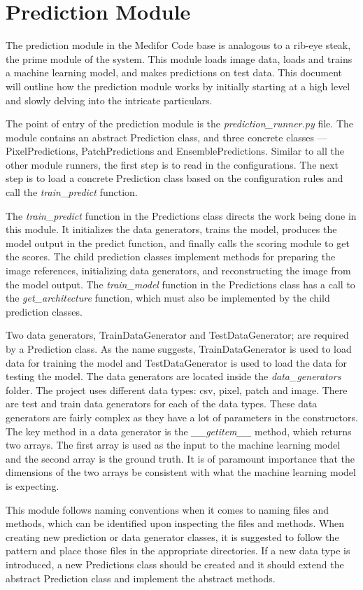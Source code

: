 \section{Prediction Module}

The prediction module in the Medifor Code base is analogous to a rib-eye steak, the prime  module of the system. This module loads image data,
 loads and trains a machine learning model, and makes predictions on test data. This document will outline how the prediction module works by
  initially starting at a high level and slowly delving into the intricate particulars.

The point of entry of the prediction module is the \emph{prediction\_runner.py} file. The module contains an abstract Prediction class, and three 
concrete classes — PixelPredictions, PatchPredictions and EnsemblePredictions. Similar to all the other module runners, the first step is
 to read in the configurations. The next step is to load a concrete Prediction class based on the configuration rules and call the 
 \emph{train\_predict} function. 

The \emph{train\_predict} function in the Predictions class directs the work being done in this module. It initializes the data generators, 
trains the model, produces the model output in the predict function, and finally calls the scoring module to get the scores. The 
child prediction classes implement methods for preparing the image references, initializing data generators, and reconstructing
 the image from the model output. The \emph{train\_model} function in the Predictions class has a call to the \emph{get\_architecture} function,
  which must also be implemented by the child prediction classes.

Two data generators, TrainDataGenerator and TestDataGenerator; are required by a Prediction class. As the name suggests, 
TrainDataGenerator is used to load data for training the model and TestDataGenerator is used to load the data for testing the model.
The data generators are located inside the \emph{data\_generators} folder. The project uses different data types: csv, pixel, patch and image.
There are test and train data generators for each of the data types. These data generators are fairly complex as they have a lot of parameters
in the  constructors. The key method in a data generator is the \emph{\_\_getitem\_\_} method, which returns two arrays. The first array is 
used as the input to the machine learning model and the second array is the ground truth. It is of paramount importance that the dimensions 
of the two arrays be consistent with what the machine learning model is expecting.

This module follows naming conventions when it comes to naming files and methods, which can be identified upon inspecting the files 
and methods. When creating new prediction or data generator classes, it is suggested to follow the pattern and place those files in 
the appropriate directories. If a new data type is introduced, a new Predictions class should be created and it should extend the 
abstract Prediction class and implement the abstract methods.
